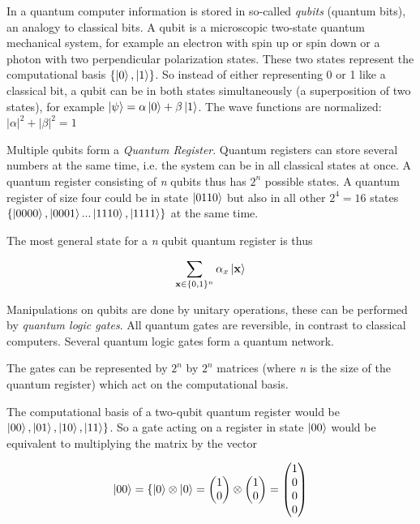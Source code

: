 ﻿In a quantum computer information is stored in so-called \emph{qubits} (quantum bits), an analogy to classical bits. A qubit is a microscopic two-state quantum mechanical system, for example an electron with spin up or spin down or a photon with two perpendicular polarization states. These two states represent the computational basis \( \{\left| 0 \right>,\left| 1 \right>\} \). So instead of either representing 0 or 1 like a classical bit, a qubit can be in both states simultaneously (a superposition of two states), for example \( \left| \psi \right> = \alpha \left| 0 \right> + \beta \left| 1 \right> \). The wave functions are normalized: \( |\alpha|^2+|\beta|^2=1 \)

Multiple qubits form a \emph{Quantum Register}. Quantum registers can store several numbers at the same time, i.e. the system can be in all classical states at once. A quantum register consisting of \emph{n} qubits thus has \(2^n\) possible states. A quantum register of size four could be in state \( \left| 0110 \right> \) but also in all other \( 2^4 = 16 \) states \( \{\left| 0000 \right>,\left| 0001 \right>...\left| 1110 \right>,\left| 1111 \right>\} \) at the same time.

The most general state for a \emph{n} qubit quantum register is thus

\begin{equation}
 \sum_{\mathbf{x}\in\{0,1\}^n} \alpha_x\left| \mathbf{x} \right>
\end{equation}

Manipulations on qubits are done by unitary operations, these can be performed by \emph{quantum logic gates}. All quantum gates are reversible, in contrast to classical computers. Several quantum logic gates form a quantum network.

The gates can be represented by \(2^n\) by \(2^n\) matrices (where \emph{n} is the size of the quantum register) which act on the computational basis.

The computational basis of a two-qubit quantum register would be \( \left| 00 \right>, \left| 01 \right>, \left| 10 \right>, \left| 11 \right> \} \). So a gate acting on a register in state \( \left| 00 \right> \) would be equivalent to multiplying the matrix by the vector

\begin{equation}
 \left| 00 \right> =\{\left| 0 \right> \otimes \left| 0 \right> = \begin{pmatrix} 1 \\ 0 \end{pmatrix} \otimes \begin{pmatrix} 1 \\ 0 \end{pmatrix} = \begin{pmatrix} 1 \\ 0\\0\\0 \end{pmatrix}
\end{equation}

